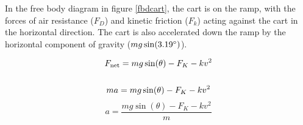 In the free body diagram in figure \ref{fbdcart}, the cart is on the ramp, with the forces of air resistance ($F_{D}$) and kinetic friction ($F_{k}$) acting
against the cart in the horizontal direction. The cart is also accelerated down the ramp by the horizontal component of gravity ($mg\sin(3.19\degree)$).


\begin{gather*}
  F_{\textup{net}} = mg\sin(\theta) - F_{K} - kv^2\\
  \\
  ma = mg\sin(\theta) - F_{K} - kv^2\\
\end{gather*}
\begin{equation}
  a = \frac{mg\sin(\theta) - F_{K} - kv^2}{m}
  \label{Eq:acceleration} %
\end{equation}


